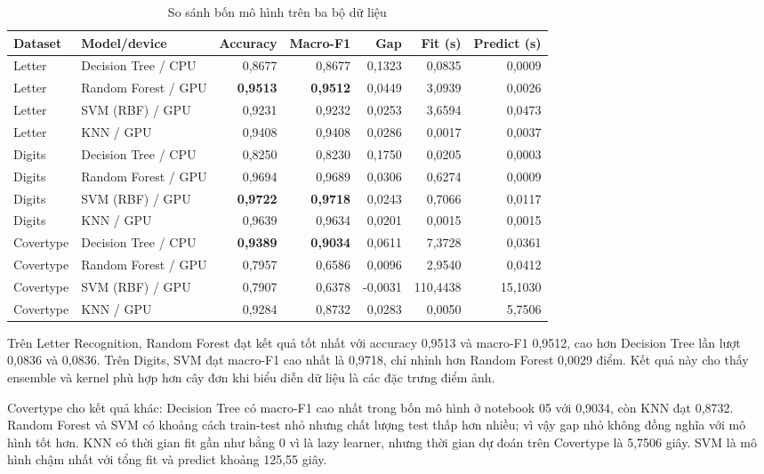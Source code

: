 \begin{table}[H]
    \centering
    \caption{So sánh bốn mô hình trên ba bộ dữ liệu}
    \label{tab:all-models}
    \scriptsize
    \begin{tabular}{@{}llrrrrr@{}}
        \toprule
        \textbf{Dataset} & \textbf{Model/device} & \textbf{Accuracy} & \textbf{Macro-F1} &
        \textbf{Gap} & \textbf{Fit (s)} & \textbf{Predict (s)} \\
        \midrule
        Letter & Decision Tree / CPU & 0,8677 & 0,8677 & 0,1323 & 0,0835 & 0,0009 \\
        Letter & Random Forest / GPU & \textbf{0,9513} & \textbf{0,9512} & 0,0449 & 3,0939 & 0,0026 \\
        Letter & SVM (RBF) / GPU & 0,9231 & 0,9232 & 0,0253 & 3,6594 & 0,0473 \\
        Letter & KNN / GPU & 0,9408 & 0,9408 & 0,0286 & 0,0017 & 0,0037 \\
        \midrule
        Digits & Decision Tree / CPU & 0,8250 & 0,8230 & 0,1750 & 0,0205 & 0,0003 \\
        Digits & Random Forest / GPU & 0,9694 & 0,9689 & 0,0306 & 0,6274 & 0,0009 \\
        Digits & SVM (RBF) / GPU & \textbf{0,9722} & \textbf{0,9718} & 0,0243 & 0,7066 & 0,0117 \\
        Digits & KNN / GPU & 0,9639 & 0,9634 & 0,0201 & 0,0015 & 0,0015 \\
        \midrule
        Covertype & Decision Tree / CPU & \textbf{0,9389} & \textbf{0,9034} & 0,0611 & 7,3728 & 0,0361 \\
        Covertype & Random Forest / GPU & 0,7957 & 0,6586 & 0,0096 & 2,9540 & 0,0412 \\
        Covertype & SVM (RBF) / GPU & 0,7907 & 0,6378 & -0,0031 & 110,4438 & 15,1030 \\
        Covertype & KNN / GPU & 0,9284 & 0,8732 & 0,0283 & 0,0050 & 5,7506 \\
        \bottomrule
    \end{tabular}
\end{table}

Trên Letter Recognition, Random Forest đạt kết quả tốt nhất với accuracy 0,9513 và
macro-F1 0,9512, cao hơn Decision Tree lần lượt 0,0836 và 0,0836. Trên Digits, SVM đạt
macro-F1 cao nhất là 0,9718, chỉ nhỉnh hơn Random Forest 0,0029 điểm. Kết quả này cho thấy
ensemble và kernel phù hợp hơn cây đơn khi biểu diễn dữ liệu là các đặc trưng điểm ảnh.

Covertype cho kết quả khác: Decision Tree có macro-F1 cao nhất trong bốn mô hình ở notebook
05 với 0,9034, còn KNN đạt 0,8732. Random Forest và SVM có khoảng cách train-test nhỏ
nhưng chất lượng test thấp hơn nhiều; vì vậy gap nhỏ không đồng nghĩa với mô hình tốt hơn.
KNN có thời gian fit gần như bằng 0 vì là lazy learner, nhưng thời gian dự đoán trên
Covertype là 5,7506 giây. SVM là mô hình chậm nhất với tổng fit và predict khoảng 125,55
giây.

